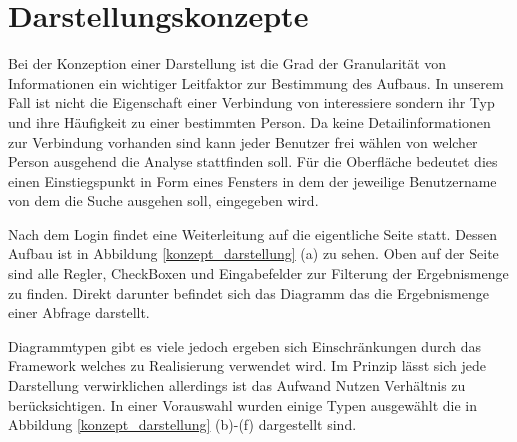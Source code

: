 \section{Darstellungskonzepte}

Bei der Konzeption einer Darstellung ist die Grad der Granularität von Informationen ein wichtiger Leitfaktor zur Bestimmung des Aufbaus. In unserem Fall ist nicht die Eigenschaft einer Verbindung von interessiere sondern ihr Typ und ihre Häufigkeit zu einer bestimmten Person. Da keine Detailinformationen zur Verbindung vorhanden sind kann jeder Benutzer frei wählen von welcher Person ausgehend die Analyse stattfinden soll. Für die Oberfläche bedeutet dies einen Einstiegspunkt in Form eines Fensters in dem der jeweilige Benutzername von dem die Suche ausgehen soll, eingegeben wird.

Nach dem Login findet eine Weiterleitung auf die eigentliche Seite statt. Dessen Aufbau ist in Abbildung \ref{konzept_darstellung} (a) zu sehen. Oben auf der Seite sind alle Regler, CheckBoxen und Eingabefelder zur Filterung der Ergebnismenge zu finden. Direkt darunter befindet sich das Diagramm das die Ergebnismenge einer Abfrage darstellt.

Diagrammtypen gibt es viele jedoch ergeben sich Einschränkungen durch das Framework welches zu Realisierung verwendet wird. Im Prinzip lässt sich jede Darstellung verwirklichen allerdings ist das Aufwand Nutzen Verhältnis zu berücksichtigen. In einer Vorauswahl wurden einige Typen ausgewählt die in Abbildung \ref{konzept_darstellung} (b)-(f) dargestellt sind. 

